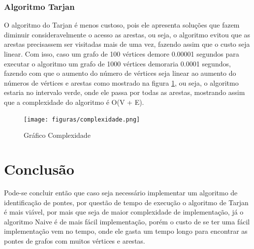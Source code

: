 \subsubsection{Algoritmo Tarjan}
O algoritmo do Tarjan é menos custoso, pois ele apresenta soluções que fazem diminuir consideravelmente o acesso as arestas, ou seja, o algoritmo evitou que as arestas precisassem ser visitadas mais de uma vez, fazendo assim que o custo seja linear. Com isso, caso um grafo de 100 vértices demore 0.00001 segundos para executar o algoritmo um grafo de 1000 vértices demoraria 0.0001 segundos, fazendo com que o aumento do número de vértices seja linear ao aumento do números de vértices e arestas como mostrado na figura \ref{fig:figure7}, ou seja, o algoritmo estaria no intervalo verde, onde ele passa por todas as arestas, mostrando assim que a complexidade do algoritmo é O(V + E).

\newpage

\begin{figure}[ht]
    \centering
    \texttt{[image: figuras/complexidade.png]}
    \caption{Gráfico Complexidade}
    \label{fig:figure7}
\end{figure}

\section{\esp Conclusão}
Pode-se concluir então que caso seja necessário implementar um algoritmo de identificação de pontes, por questão de tempo de execução o algoritmo de Tarjan é mais viável, por mais que seja de maior complexidade de implementação, já o algoritmo Naive é de mais fácil implementação, porém o custo de se ter uma fácil implementação vem no tempo, onde ele gasta um tempo longo para encontrar as pontes de grafos com muitos vértices e arestas.